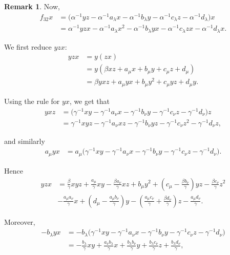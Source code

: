 \documentclass{amsart}
\theoremstyle{definition}
\newtheorem{remark}[theorem]{Remark}
\theoremstyle{remark}
\numberwithin{equation}{section}
\begin{document}
\begin{remark}
Now,
\begin{align*}
f_{32}x
&=\bigl(\alpha^{-1}yz-\alpha^{-1}a_{\lambda}x-\alpha^{-1}b_{\lambda}y-\alpha^{-1}c_{\lambda}z-\alpha^{-1}d_{\lambda}\bigr)x\\
&=\alpha^{-1}yzx-\alpha^{-1}a_{\lambda}x^2-\alpha^{-1}b_{\lambda}yx-\alpha^{-1}c_{\lambda}zx-\alpha^{-1}d_{\lambda}x.
\end{align*}

We first reduce $yzx$:
\begin{align*}
yzx
&=y(zx)\\
&=y(\beta xz+a_{\mu}x+b_{\mu}y+c_{\mu}z+d_{\mu})\\
&=\beta yxz+a_{\mu}yx+b_{\mu}y^2+c_{\mu}yz+d_{\mu}y.
\end{align*}

Using the rule for $yx$, we get that
\begin{align*}
yxz
&=\bigl(\gamma^{-1}xy-\gamma^{-1}a_{\nu}x-\gamma^{-1}b_{\nu}y-\gamma^{-1}c_{\nu}z-\gamma^{-1}d_{\nu}\bigr)z\\
&=\gamma^{-1}xyz-\gamma^{-1}a_{\nu}xz-\gamma^{-1}b_{\nu}yz-\gamma^{-1}c_{\nu}z^2-\gamma^{-1}d_{\nu}z,
\end{align*}

and similarly
\begin{align*}
a_{\mu}yx
&=a_{\mu}\bigl(\gamma^{-1}xy-\gamma^{-1}a_{\nu}x-\gamma^{-1}b_{\nu}y-\gamma^{-1}c_{\nu}z-\gamma^{-1}d_{\nu}\bigr).
\end{align*}

Hence
\begin{align*}
yzx
&= \frac{\beta}{\gamma}xyz
+\frac{a_{\mu}}{\gamma}xy
-\frac{\beta a_{\nu}}{\gamma}xz
+b_{\mu}y^2
+\left(c_{\mu}-\frac{\beta b_{\nu}}{\gamma}\right)yz
-\frac{\beta c_{\nu}}{\gamma}z^2\\
&
-\frac{a_{\mu}a_{\nu}}{\gamma}x
+\left(d_{\mu}-\frac{a_{\mu}b_{\nu}}{\gamma}\right)y
-\left(\frac{a_{\mu}c_{\nu}}{\gamma}+\frac{\beta d_{\nu}}{\gamma}\right)z
-\frac{a_{\mu}d_{\nu}}{\gamma}.
\end{align*}

Moreover,
\begin{align*}
-b_{\lambda}yx
&=-b_{\lambda}\bigl(\gamma^{-1}xy-\gamma^{-1}a_{\nu}x-\gamma^{-1}b_{\nu}y-\gamma^{-1}c_{\nu}z-\gamma^{-1}d_{\nu}\bigr)\\
&=-\frac{b_{\lambda}}{\gamma}xy+\frac{a_{\nu}b_{\lambda}}{\gamma}x+\frac{b_{\lambda}b_{\nu}}{\gamma}y+\frac{b_{\lambda}c_{\nu}}{\gamma}z+\frac{b_{\lambda}d_{\nu}}{\gamma},
\end{align*}


\end{remark}
\end{document}
